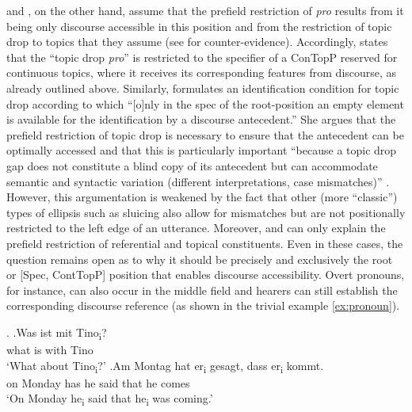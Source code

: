 \citet{trutkowski2016} and \citet{freywald2020}, on the other hand, assume that the prefield restriction of \textit{pro} results from it being only discourse accessible in this position and from the restriction of topic drop to topics that they assume (see  for counter-evidence).
Accordingly, \citet[170--172]{freywald2020} states that the ``topic drop \textit{pro}'' is restricted to the specifier of a ConTopP reserved for continuous topics, where it receives its corresponding features from discourse, as already outlined above.
Similarly, \citet[176]{trutkowski2016} formulates an identification condition for topic drop according to which ``[o]nly in the spec of the root-position an empty element is available for the identification by a discourse antecedent.'' 
She argues that the prefield restriction of topic drop is necessary to ensure that the antecedent  can be optimally accessed and that this is particularly important ``because a topic drop gap does not constitute a blind copy of its antecedent  but can accommodate semantic and syntactic variation (different interpretations, case mismatches)'' \citep[19]{trutkowski2016}.
However, this argumentation is weakened by the fact that other (more ``classic'') types of ellipsis such as sluicing  also allow for mismatches \citep{kroll.rudin2017,anand.etal2021} but are not positionally restricted to the left edge of an utterance.
Moreover, \citet{trutkowski2016} and \citet{freywald2020} can only explain the prefield restriction of referential and topical constituents.
Even in these cases, the question remains open as to why it should be precisely and exclusively the root or [Spec, ContTopP] position that enables discourse accessibility.
Overt pronouns, for instance, can also occur in the middle field  and hearers can still establish the corresponding discourse reference (as shown in the trivial example \ref{ex:pronoun}).

\ex.\label{ex:pronoun}
\ag.Was ist mit Tino\textsubscript{i}?\\
what is with Tino\\
`What about Tino\textsubscript{i}?'
\bg.Am Montag hat er\textsubscript{i} gesagt, dass er\textsubscript{i} kommt.\\
on Monday has he said that he comes\\
`On Monday he\textsubscript{i} said that he\textsubscript{i} was coming.'

